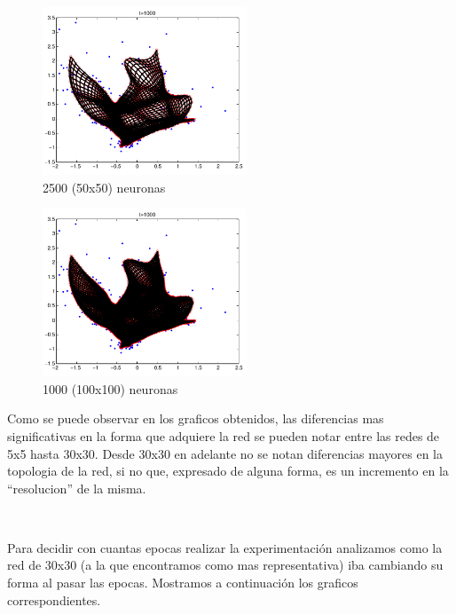 \documentclass[informe.tex]{subfiles}
\begin{document}
      \begin{minipage}{0.45\textwidth}
	 \centering
	\begin{figure}[H]
	  \centering
	    \includegraphics[height=5cm,keepaspectratio]{graficos/malla/50x50.png}
		  \caption{\small 2500 (50x50) neuronas}
	\end{figure}
      \end{minipage}
      \begin{minipage}{0.45\textwidth}
	 \centering
	\begin{figure}[H]
	  \centering
	  \includegraphics[height=5cm,keepaspectratio]{graficos/malla/100x100.png}
                \caption{\small 1000 (100x100) neuronas}
	\end{figure}
      \end{minipage}
      
       \restoregeometry
       
       Como se puede observar en los graficos obtenidos, las diferencias mas significativas en la forma que adquiere la red se pueden notar entre las redes de 5x5 hasta 30x30. Desde 30x30 en adelante no se notan diferencias mayores en la topologia de la red, si no que, expresado de alguna forma, es un incremento en la ``resolucion'' de la misma.
       
       ~
       
       Para decidir con cuantas epocas realizar la experimentación analizamos como la red de 30x30 (a la que encontramos como mas representativa) iba cambiando su forma al pasar las epocas. Mostramos a continuación los graficos correspondientes.       
       
\end{document}
